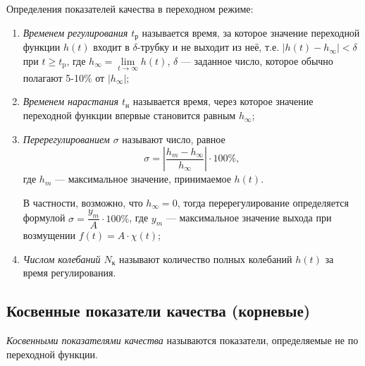 \documentclass[../../TAU.tex]{subfiles}
\begin{document}
    Определения показателей качества в переходном режиме:
    \begin{enumerate}
        \item {\it Временем регулирования $t_\text{р}$}
            называется время, за которое значение переходной функции $h(t)$ входит в $\delta$-трубку и не выходит из неё, т.е. $|h(t)-h_{\infty}| <\delta $ при $t \ge t_\text{p}$, где $h_\infty = \lim\limits_{t\rightarrow\infty} h(t)$, $\delta$ --- заданное число, которое обычно полагают 5-10\% от $|h_{\infty}|$;
        \item {\it Временем нарастания $t_\text{н}$}
            называется время, через которое значение переходной функции впервые становится равным $h_\infty$;
        \item {\it Перерегулированием $\sigma$}
            называют число, равное
            $$
                \sigma = \left|\frac{h_m-h_\infty}{h_\infty}\right|\cdot100\%,
            $$
            где $h_m$ --- максимальное значение, принимаемое $h(t)$.

            В частности, возможно, что $h_\infty = 0$, тогда перерегулирование определяется формулой $ \sigma = \dfrac{y_m}{A}\cdot 100\%$, где $y_m$ --- максимальное значение выхода при возмущении $f(t) = A\cdot\chi(t)$;
        \item {\it Числом колебаний $N_\text{к}$} 
            называют количество полных колебаний $h(t)$ за время регулирования.
    \end{enumerate}

\subsection{Косвенные показатели качества (корневые)}

    {\it Косвенными показателями качества} называются показатели, определяемые не по переходной функции.
\end{document}
